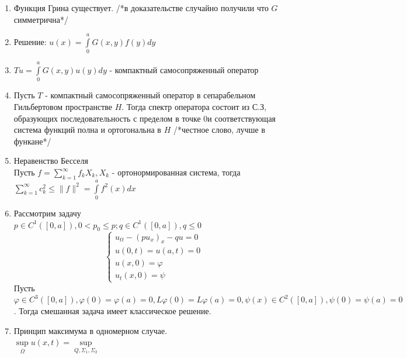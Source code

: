 \documentclass[a4paper,12pt]{article}
\newcommand {\FI} {\varphi}
\newcommand {\iii} {\int\limits}
\newcommand {\LS} {\sum\limits}
\begin{document}
\begin{enumerate}
\item Функция Грина существует. /*в доказательстве случайно получили что $G$ симметрична*/
\item Решение: $u(x) = \iii_0^a G(x,y)f(y)dy$
\item $T u = \iii_0^aG(x,y)u(y)dy$ - компактный самосопряженный оператор
\item Пусть $T$ - компактный самосопряженный оператор в сепарабельном Гильбертовом пространстве $H$. Тогда спектр оператора состоит из С.З, образующих последовательность с пределом в точке 0и соответствующая система функций полна и ортогональна в $H$ /*честное слово, лучше в функане*/
\item Неравенство Бесселя\\
Пусть $f = \LS_{k=1}^\infty f_kX_k, X_k$ - ортонормированная система, тогда $\LS_{k=1}^\infty c_k^2 \le \|f\|^2=\iii_0^af^2(x)dx$
\item Рассмотрим задачу\\
$p\in C^1([0,a]), 0<p_0\le p; q\in C^1([0,a]), q\le0$
\begin{equation*}
 \begin{cases}
   u_{tt} - (pu_x)_x-qu=0
   \\
	u(0,t) = u(a,t) = 0
	\\
	u(x,0)=\FI
\\
u_t(x,0)=\psi
\end{cases}
\end{equation*}
Пусть $\FI \in C^3([0,a]), \FI(0)=\FI(a)=0, L\FI(0)=L\FI(a)=0, \psi(x)\in C^2([0,a]),\psi(0)=\psi(a)=0$. Тогда смешанная задача имеет классическое решение.
\item Принцип максимума в одномерном случае.\\
$\sup\limits_{\overline{\Omega}}u(x,t) = \sup\limits_{Q, \Sigma_1, \Sigma_2}$

\begin{figure}[h!]
\label{fig:mpr}
\end{figure}


\end{enumerate}
\end{document}
